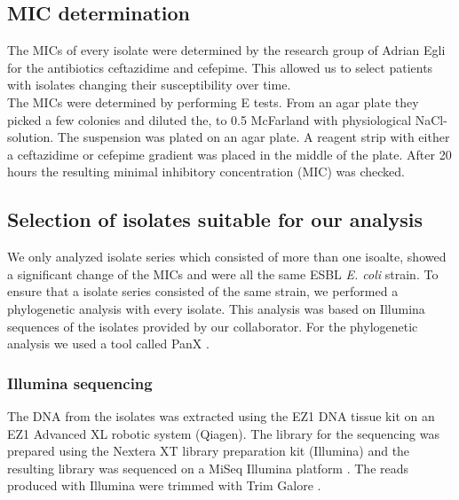 \subsection{MIC determination}
The MICs of every isolate were determined by the research group of Adrian Egli for the antibiotics ceftazidime and cefepime. This allowed us to select patients with isolates changing their susceptibility over time. \\
The MICs were determined by performing E tests. From an agar plate they picked a few colonies and diluted the, to 0.5 McFarland with physiological NaCl-solution. The suspension was plated on an agar plate. A reagent strip with either a ceftazidime or cefepime gradient was placed in the middle of the plate. After 20 hours the resulting minimal inhibitory concentration (MIC) was checked.

\subsection{Selection of isolates suitable for our analysis}
We only analyzed isolate series which consisted of more than one isoalte, showed a significant change of the MICs and were all the same ESBL \textit{E. coli} strain. To ensure that a isolate series consisted of the same strain, we performed a phylogenetic analysis with every isolate. This analysis was based on Illumina sequences of the isolates provided by our collaborator. For the phylogenetic analysis we used a tool called PanX \cite{ding_panx:_2018}.

\subsubsection{Illumina sequencing}
The DNA from the isolates was extracted using the EZ1 DNA tissue kit on an EZ1 Advanced XL robotic system (Qiagen). The library for the sequencing was prepared using the Nextera XT library preparation kit (Illumina) and the resulting library was sequenced on a MiSeq Illumina platform \cite{nanopore}. The reads produced with Illumina were trimmed with Trim Galore \cite{noauthor_babraham_nodate}.
\label{section:illumina}

